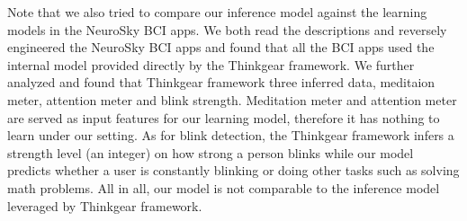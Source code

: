 \indent Note that we also tried to compare our inference model against the learning models in the NeuroSky BCI apps. We both read the descriptions and reversely engineered the NeuroSky BCI apps and found that all the BCI apps used the internal model provided directly by the Thinkgear framework. We further analyzed and found that Thinkgear framework three inferred data, meditaion meter, attention meter and blink strength. Meditation meter and attention meter are served as input features for our learning model, therefore it has nothing to learn under our setting. As for blink detection, the Thinkgear framework infers a strength level (an integer) on how strong a person blinks while our model predicts whether a user is constantly blinking or doing other tasks such as solving math problems. All in all, our model is not comparable to the inference model leveraged by Thinkgear framework.

